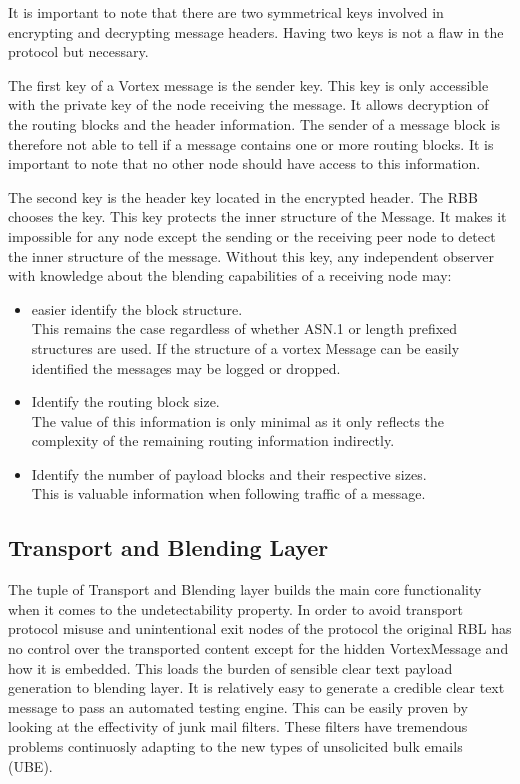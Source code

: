 \documentclass[10pt,journal,compsoc]{IEEEtran}
\begin{document}
It is important to note that there are two symmetrical keys involved in encrypting and decrypting message headers. Having two keys is not a flaw in the protocol but necessary. 

The first key of a Vortex message is the sender key. This key is only accessible with the private key of the node receiving the message. It allows decryption of the routing blocks and the header information. The sender of a message block is therefore not able to tell if a message contains one or more routing blocks. It is important to note that no other node should have access to this information. 

The second key is the header key located in the encrypted header. The RBB chooses the key. This key protects the inner structure of the Message. It makes it impossible for any node except the sending or the receiving peer node to detect the inner structure of the message. Without this key, any independent observer with knowledge about the blending capabilities of a receiving node may:
\begin{itemize}
	\item easier identify the block structure.\\ 
	This remains the case regardless of whether ASN.1 or length prefixed structures are used. If the structure of a vortex Message can be easily identified the messages may be logged or dropped.
	\item Identify the routing block size.\\
	The value of this information is only minimal as it only reflects the complexity of the remaining routing information indirectly.
	\item Identify the number of payload blocks and their respective sizes. \\
	This is valuable information when following traffic of a message.
\end{itemize}

\subsection{Transport and Blending Layer\label{sec:transportAndBlending}}
The tuple of Transport and Blending layer builds the main core functionality when it comes to the undetectability property. In order to avoid transport protocol misuse and unintentional exit nodes of the protocol the original RBL has no control over the transported content except for the hidden VortexMessage and how it is embedded. This loads the burden of sensible clear text payload generation to blending layer. It is relatively easy to generate a credible clear text message to pass an automated testing engine. This can be easily proven by looking at the effectivity of junk mail filters. These filters have tremendous problems continuosly adapting to the new types of unsolicited bulk emails (UBE).
\end{document}
